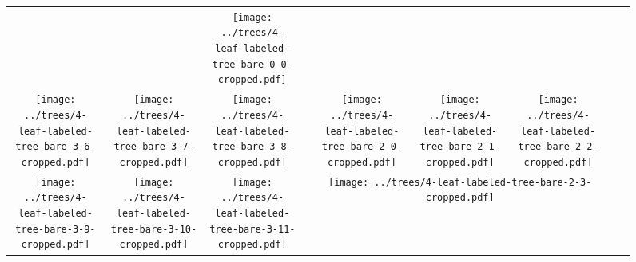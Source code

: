\documentclass[border=10pt,varwidth=30cm]{standalone}
\newcommand{\pltwidth}{0.1}
\begin{document}
\begin{figure}
\begin{tabular}{@{}ccccccccc@{}}
        &
        &
        \texttt{[image: ../trees/4-leaf-labeled-tree-bare-0-0-cropped.pdf]}
        \\
        \texttt{[image: ../trees/4-leaf-labeled-tree-bare-3-6-cropped.pdf]}
        &
        \texttt{[image: ../trees/4-leaf-labeled-tree-bare-3-7-cropped.pdf]}
        &
        \texttt{[image: ../trees/4-leaf-labeled-tree-bare-3-8-cropped.pdf]}
        &
        &
        \texttt{[image: ../trees/4-leaf-labeled-tree-bare-2-0-cropped.pdf]}
        &
        \texttt{[image: ../trees/4-leaf-labeled-tree-bare-2-1-cropped.pdf]}
        &
        \texttt{[image: ../trees/4-leaf-labeled-tree-bare-2-2-cropped.pdf]}
        &
        &
        \\
        \texttt{[image: ../trees/4-leaf-labeled-tree-bare-3-9-cropped.pdf]}
        &
        \texttt{[image: ../trees/4-leaf-labeled-tree-bare-3-10-cropped.pdf]}
        &
        \texttt{[image: ../trees/4-leaf-labeled-tree-bare-3-11-cropped.pdf]}
        &
        &
        \multicolumn{3}{c}{\texttt{[image: ../trees/4-leaf-labeled-tree-bare-2-3-cropped.pdf]}}
        &
        &
        \\
    \end{tabular}
\end{figure}
\end{document}
